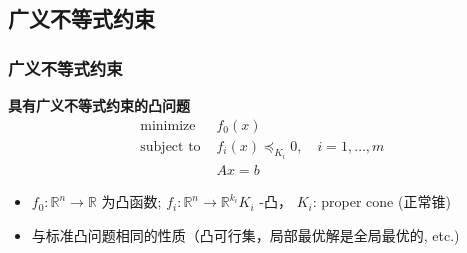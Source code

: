 \documentclass[handout]{beamer}
\begin{document}
\begin{frame}
	\subsection{广义不等式约束}
	\begin{frame}
		\frametitle{广义不等式约束}
		\textbf{具有广义不等式约束的凸问题}
		\begin{equation}
			\begin{array}{ll}
				\text{ minimize } & f_{0}(x) \\
				\text { subject to } & f_{i}(x) \preceq_{K_{i}} 0, \quad i=1, \ldots, m \\
				& A x=b
			\end{array}
		\end{equation}
		\begin{itemize}[<+->]
			\item $f_{0}: \mathbb{R}^{n} \rightarrow \mathbb{R}$ 为凸函数; $f_{i}: \mathbb{R}^{n} \rightarrow \mathbb{R}^{k_{i}} K_{i}$ -凸， $K_{i}$: proper cone (正常锥)
			\item 与标准凸问题相同的性质（凸可行集，局部最优解是全局最优的, etc.)
		\end{itemize}
		
	\end{frame}

\end{frame}
\end{document}
